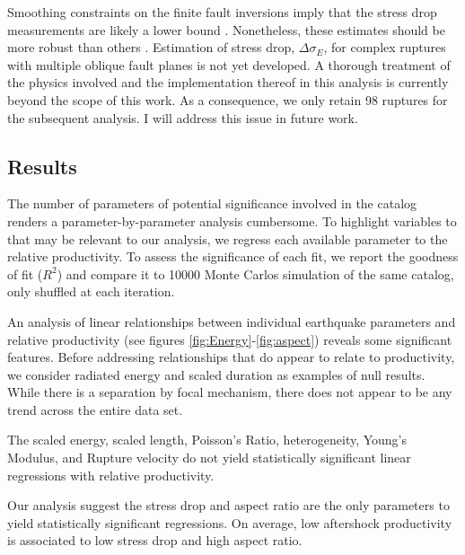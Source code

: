 \documentclass[12pt, notitlepage]{report}
\begin{document}
Smoothing constraints on the finite fault inversions imply that the stress drop measurements are likely a lower bound \cite{Adams2017ExploringInversions}. Nonetheless, these estimates should be more robust than others \cite{Noda2013}. Estimation of stress drop, $\Delta \sigma_E$, for complex ruptures with multiple oblique fault planes is not yet developed. A thorough treatment of the physics involved and the implementation thereof in this analysis is currently beyond the scope of this work. As a consequence, we only retain 98 ruptures for the subsequent analysis. I will address this issue in future work.

\subsection{Results}

The number of parameters of potential significance involved in the \textcite{Hayes2017} catalog renders a parameter-by-parameter analysis cumbersome. To highlight variables to that may be relevant to our analysis, we regress each available parameter to the relative productivity. To assess the significance of each fit, we report the goodness of fit ($R^2$) and compare it to 10000 Monte Carlos simulation of the same catalog, only shuffled at each iteration.

An analysis of linear relationships between individual earthquake parameters and relative productivity (see figures \ref{fig:Energy}-\ref{fig:aspect}) reveals some significant features. Before addressing relationships that do appear to relate to productivity, we consider radiated energy and scaled duration as examples of null results. While there is a separation by focal mechanism, there does not appear to be any trend across the entire data set. 

The scaled energy, scaled length, Poisson's Ratio, heterogeneity, Young's Modulus, and Rupture velocity do not yield statistically significant linear regressions with relative productivity. 
 
Our analysis suggest the stress drop and aspect ratio are the only parameters to yield statistically significant regressions. On average, low aftershock productivity is associated to low stress drop and high aspect ratio. 
\end{document}
